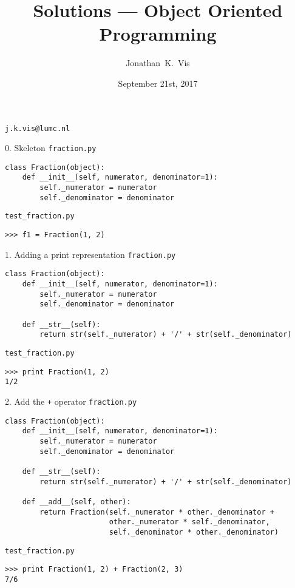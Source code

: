 \documentclass{beamer}
\author{Jonathan~K.~Vis}
\institute[LUMC]{Dept. of Human Genetics, Leiden University Medical Center}
\date{September 21st, 2017}
\title{Solutions --- Object Oriented Programming}
\begin{document}
\beamertemplatenavigationsymbolsempty

\begin{frame}
\titlepage
\vfill
\hfill \textcolor{pms280_compl}{\texttt{j.k.vis@lumc.nl}}
\end{frame}

\begin{frame}[fragile]{0. Skeleton}
\small
\texttt{fraction.py}
\begin{verbatim}
class Fraction(object):
    def __init__(self, numerator, denominator=1):
        self._numerator = numerator
        self._denominator = denominator
\end{verbatim}

\vfill

\texttt{test\_fraction.py}
\begin{verbatim}
>>> f1 = Fraction(1, 2)
\end{verbatim}
\end{frame}

\begin{frame}[fragile]{1. Adding a print representation}
\small
\texttt{fraction.py}
\begin{verbatim}
class Fraction(object):
    def __init__(self, numerator, denominator=1):
        self._numerator = numerator
        self._denominator = denominator

    def __str__(self):
        return str(self._numerator) + '/' + str(self._denominator)
\end{verbatim}

\vfill

\texttt{test\_fraction.py}
\begin{verbatim}
>>> print Fraction(1, 2)
1/2
\end{verbatim}
\end{frame}

\begin{frame}[fragile]{2. Add the \texttt{+} operator}
\small
\texttt{fraction.py}
\begin{verbatim}
class Fraction(object):
    def __init__(self, numerator, denominator=1):
        self._numerator = numerator
        self._denominator = denominator

    def __str__(self):
        return str(self._numerator) + '/' + str(self._denominator)

    def __add__(self, other):
        return Fraction(self._numerator * other._denominator +
                        other._numerator * self._denominator,
                        self._denominator * other._denominator)
\end{verbatim}

\vfill

\texttt{test\_fraction.py}
\begin{verbatim}
>>> print Fraction(1, 2) + Fraction(2, 3)
7/6
\end{verbatim}
\end{frame}
\end{document}

